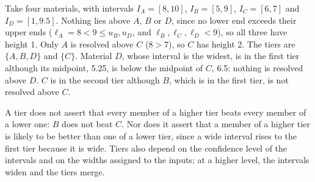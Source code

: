 Take four materials, with intervals $I_A = [8, 10]$, $I_B = [5, 9]$, $I_C = [6, 7]$ and $I_D = [1, 9.5]$. Nothing lies above $A$, $B$ or $D$, since no lower end exceeds their upper ends ($\ell_A = 8 < 9 \le u_B, u_D$, and $\ell_B, \ell_C, \ell_D < 9$), so all three have height 1. Only $A$ is resolved above $C$ ($8 > 7$), so $C$ has height 2. The tiers are $\{A, B, D\}$ and $\{C\}$. Material $D$, whose interval is the widest, is in the first tier although its midpoint, 5.25, is below the midpoint of $C$, 6.5: nothing is resolved above $D$. $C$ is in the second tier although $B$, which is in the first tier, is not resolved above $C$.

A tier does not assert that every member of a higher tier beats every member of a lower one: $B$ does not beat $C$. Nor does it assert that a member of a higher tier is likely to be better than one of a lower tier, since a wide interval rises to the first tier because it is wide. Tiers also depend on the confidence level of the intervals and on the widths assigned to the inputs; at a higher level, the intervals widen and the tiers merge.
